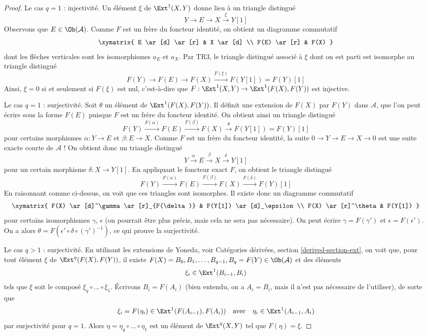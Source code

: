 \begin{proof}
\medskip\noindent
Le cas $q = 1$ : injectivité. Un élément $\xi$ de $\Ext^1(X, Y)$
donne lieu à un triangle distingué
$$
Y \to E \to X \xrightarrow{\xi} Y[1]
$$
Observons que $E \in \Ob(\mathcal{A})$. Comme $F$ est un frère du
foncteur identité, on obtient un diagramme commutatif
$$
\xymatrix{
E \ar[d] \ar[r] & X \ar[d] \\
F(E) \ar[r] & F(X)
}
$$
dont les flèches verticales sont les isomorphismes $a_E$ et $a_X$.
Par TR3, le triangle distingué associé à $\xi$ dont on est parti
est isomorphe au triangle distingué
$$
F(Y) \to F(E) \to F(X) \xrightarrow{F(\xi)} F(Y[1]) = F(Y)[1]
$$
Ainsi, $\xi = 0$ si et seulement si $F(\xi)$ est nul, c'est-à-dire que
$F : \Ext^1(X, Y) \to \Ext^1(F(X), F(Y))$ est injective.

\medskip\noindent
Le cas $q = 1$ : surjectivité. Soit $\theta$ un élément de
$\Ext^1(F(X), F(Y))$. Il définit une extension de $F(X)$ par $F(Y)$
dans $\mathcal{A}$, que l'on peut écrire sous la forme $F(E)$
puisque $F$ est un frère du foncteur identité. On obtient ainsi un triangle
distingué
$$
F(Y) \xrightarrow{F(\alpha)} F(E)
\xrightarrow{F(\beta)} F(X)
\xrightarrow{\theta} F(Y[1]) = F(Y)[1]
$$
pour certains morphismes $\alpha : Y \to E$ et $\beta : E \to X$.
Comme $F$ est un frère du foncteur identité, la suite
$0 \to Y \to E \to X \to 0$
est une suite exacte courte de $\mathcal{A}$ ! On obtient donc un
triangle distingué
$$
Y \xrightarrow{\alpha} E \xrightarrow{\beta} X \xrightarrow{\delta} Y[1]
$$
pour un certain morphisme $\delta : X \to Y[1]$. En appliquant le foncteur exact
$F$, on obtient le triangle distingué
$$
F(Y) \xrightarrow{F(\alpha)} F(E) \xrightarrow{F(\beta)} F(X)
\xrightarrow{F(\delta)} F(Y)[1]
$$
En raisonnant comme ci-dessus, on voit que ces triangles sont isomorphes.
Il existe donc un diagramme commutatif
$$
\xymatrix{
F(X) \ar[d]^\gamma \ar[r]_{F(\delta)} & F(Y[1]) \ar[d]_\epsilon \\
F(X) \ar[r]^\theta & F(Y[1])
}
$$
pour certains isomorphismes $\gamma$, $\epsilon$ (on pourrait être plus précis, mais cela
ne sera pas nécessaire). On peut écrire $\gamma = F(\gamma')$ et
$\epsilon = F(\epsilon')$. On a alors
$\theta = F(\epsilon' \circ \delta \circ (\gamma')^{-1})$,
ce qui prouve la surjectivité.

\medskip\noindent
Le cas $q > 1$ : surjectivité. En utilisant les extensions de Yoneda, voir
Catégories dérivées, section \ref{derived-section-ext}, on voit que, pour tout
élément $\xi$ de $\Ext^q(F(X), F(Y))$, il existe
$F(X) = B_0, B_1, \ldots, B_{q - 1}, B_q = F(Y) \in \Ob(\mathcal{A})$ et des
éléments
$$
\xi_i \in \Ext^1(B_{i - 1}, B_i)
$$
tels que $\xi$ soit le composé $\xi_q \circ \ldots \circ \xi_1$.
Écrivons $B_i = F(A_i)$ (bien entendu, on a $A_i = B_i$, mais il n'est pas
nécessaire de l'utiliser), de sorte que
$$
\xi_i = F(\eta_i) \in \Ext^1(F(A_{i - 1}), F(A_i))
\quad\text{avec}\quad
\eta_i \in \Ext^1(A_{i - 1}, A_i)
$$
par surjectivité pour $q = 1$. Alors $\eta = \eta_q \circ \ldots \circ \eta_1$
est un élément de $\Ext^q(X, Y)$ tel que $F(\eta) = \xi$.


\end{proof}
